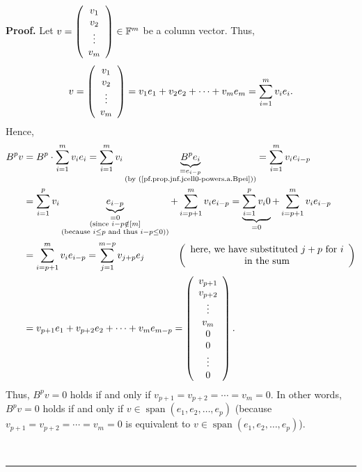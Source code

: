 \documentclass[numbers=enddot,12pt,final,onecolumn,notitlepage]{scrartcl}%
\numberwithin{exer}{subsection}
\theoremstyle{definition}
\newenvironment{proof}[1][Proof]{\noindent\textbf{#1.} }{\ \rule{0.5em}{0.5em}}
\let\sumnonlimits\sum
\renewcommand{\sum}{\sumnonlimits\limits}
\begin{document}
\begin{proof}
Let $v=\left(
\begin{array}
[c]{c}%
v_{1}\\
v_{2}\\
\vdots\\
v_{m}%
\end{array}
\right)  \in\mathbb{F}^{m}$ be a column vector. Thus,
\[
v=\left(
\begin{array}
[c]{c}%
v_{1}\\
v_{2}\\
\vdots\\
v_{m}%
\end{array}
\right)  =v_{1}e_{1}+v_{2}e_{2}+\cdots+v_{m}e_{m}=\sum_{i=1}^{m}v_{i}e_{i}.
\]
Hence,%
\begin{align*}
B^{p}v  &  =B^{p}\cdot\sum_{i=1}^{m}v_{i}e_{i}=\sum_{i=1}^{m}v_{i}%
\underbrace{B^{p}e_{i}}_{\substack{=e_{i-p}\\\text{(by
(\ref{pf.prop.jnf.jcell0-powers.a.Bpei}))}}}=\sum_{i=1}^{m}v_{i}e_{i-p}\\
&  =\sum_{i=1}^{p}v_{i}\underbrace{e_{i-p}}_{\substack{=0\\\text{(since
}i-p\notin\left[  m\right]  \\\text{(because }i\leq p\text{ and thus }%
i-p\leq0\text{))}}}+\sum_{i=p+1}^{m}v_{i}e_{i-p}=\underbrace{\sum_{i=1}%
^{p}v_{i}0}_{=0}+\sum_{i=p+1}^{m}v_{i}e_{i-p}\\
&  =\sum_{i=p+1}^{m}v_{i}e_{i-p}=\sum_{j=1}^{m-p}v_{j+p}e_{j}%
\ \ \ \ \ \ \ \ \ \ \left(
\begin{array}
[c]{c}%
\text{here, we have substituted }j+p\text{ for }i\\
\text{in the sum}%
\end{array}
\right) \\
&  =v_{p+1}e_{1}+v_{p+2}e_{2}+\cdots+v_{m}e_{m-p}=\left(
\begin{array}
[c]{c}%
v_{p+1}\\
v_{p+2}\\
\vdots\\
v_{m}\\
0\\
0\\
\vdots\\
0
\end{array}
\right)  .
\end{align*}
Thus, $B^{p}v=0$ holds if and only if $v_{p+1}=v_{p+2}=\cdots=v_{m}=0$. In
other words, $B^{p}v=0$ holds if and only if $v\in\operatorname*{span}\left(
e_{1},e_{2},\ldots,e_{p}\right)  $ (because $v_{p+1}=v_{p+2}=\cdots=v_{m}=0$
is equivalent to $v\in\operatorname*{span}\left(  e_{1},e_{2},\ldots
,e_{p}\right)  $).


\end{proof}
\end{document}
